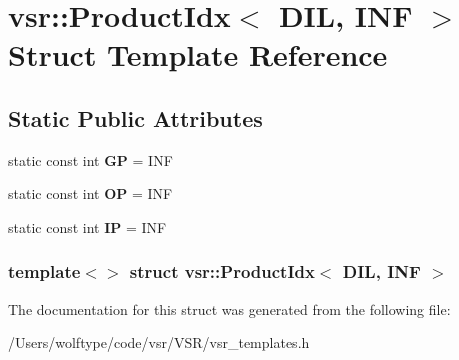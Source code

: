 \hypertarget{structvsr_1_1_product_idx_3_01_d_i_l_00_01_i_n_f_01_4}{\section{vsr\-:\-:Product\-Idx$<$ D\-I\-L, I\-N\-F $>$ Struct Template Reference}
\label{structvsr_1_1_product_idx_3_01_d_i_l_00_01_i_n_f_01_4}
}
\subsection*{Static Public Attributes}
\begin{DoxyCompactItemize}
\item 
\hypertarget{structvsr_1_1_product_idx_3_01_d_i_l_00_01_i_n_f_01_4_ad3a4a2aed83493080d2e9031ea47fe09}{static const int {\bfseries G\-P} = I\-N\-F}\label{structvsr_1_1_product_idx_3_01_d_i_l_00_01_i_n_f_01_4_ad3a4a2aed83493080d2e9031ea47fe09}

\item 
\hypertarget{structvsr_1_1_product_idx_3_01_d_i_l_00_01_i_n_f_01_4_ad5a106a99470e8178bec3d7e1e90f5ab}{static const int {\bfseries O\-P} = I\-N\-F}\label{structvsr_1_1_product_idx_3_01_d_i_l_00_01_i_n_f_01_4_ad5a106a99470e8178bec3d7e1e90f5ab}

\item 
\hypertarget{structvsr_1_1_product_idx_3_01_d_i_l_00_01_i_n_f_01_4_a72fdd3e399bd515554c185da1dabf1df}{static const int {\bfseries I\-P} = I\-N\-F}\label{structvsr_1_1_product_idx_3_01_d_i_l_00_01_i_n_f_01_4_a72fdd3e399bd515554c185da1dabf1df}

\end{DoxyCompactItemize}
\subsubsection*{template$<$$>$ struct vsr\-::\-Product\-Idx$<$ D\-I\-L, I\-N\-F $>$}



The documentation for this struct was generated from the following file\-:\begin{DoxyCompactItemize}
\item 
/\-Users/wolftype/code/vsr/\-V\-S\-R/vsr\-\_\-templates.\-h\end{DoxyCompactItemize}
